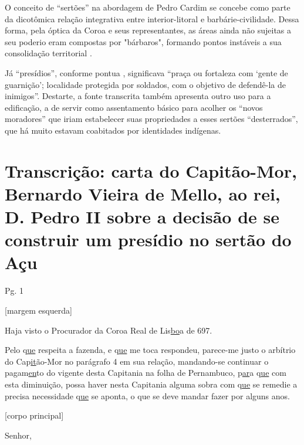 \begin{refsection}
    O conceito de “sertões” na abordagem de Pedro Cardim se concebe como parte da dicotômica relação integrativa entre interior-litoral e barbárie-civi\-li\-da\-de. Dessa forma, pela óptica da Coroa e seus representantes, as áreas ainda não sujeitas a seu poderio eram compostas por "bárbaros", formando pontos instáveis a sua consolidação territorial \cite[p.~43]{DOMINGUES2019indígenas}. 

    Já “presídios”, conforme pontua \textcite[p.~28]{SILVA2015Ribeira}, significava “praça ou fortaleza com ‘gente de guarnição’; localidade protegida por soldados, com o objetivo de defendê-la de inimigos”. Destarte, a fonte transcrita também apresenta outro uso para a edificação, a de servir como assentamento básico para acolher os “novos moradores” que iriam estabelecer suas propriedades a esses sertões “desterrados”, que há muito estavam coabitados por identidades indígenas.

    \section{Transcrição: carta do Capitão-Mor, Bernardo Vieira de Mel\-lo, ao rei, D. Pedro II sobre a decisão de se construir um presídio no sertão do Açu}

    \noindent{}Pg. 1

    \vspace{1ex}

    \noindent{}[margem esquerda]

    \vspace{1ex}

    Haja visto o Procurador da Coroa Real de Lis\underline{bo}a de 697.

    Pelo q\underline{ue} respeita a fazenda, e q\underline{ue} me toca respondeu, parece-me justo o arbítrio do Cap\underline{it}ão-Mor no parágrafo 4 em sua relação, mandando-se continuar o pagam\underline{en}to do vigente desta Capitania na folha de Pernambuco, p\underline{ar}a q\underline{ue} com esta diminuição, possa haver nesta Capitania alguma sobra com q\underline{ue} se remedie a precisa necessidade q\underline{ue} se aponta, o que se deve mandar fazer por alguns anos.

    \vspace{1ex}

    \noindent{}[corpo principal] 

    \vspace{1ex}

    Senhor,  


\end{refsection}
